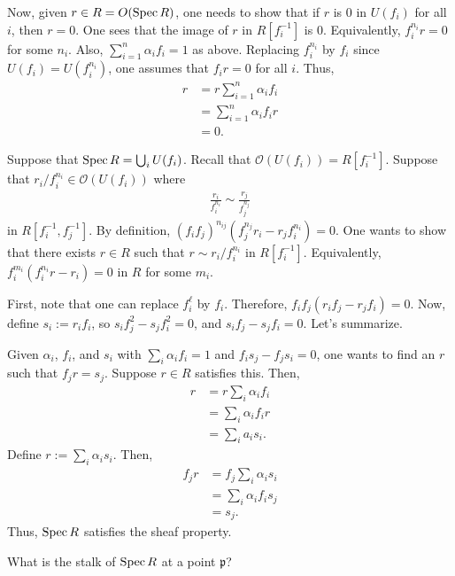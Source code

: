 \documentclass [11 pt, oneside] {article}
\begin{document}
Now, given $r\in R = \relax{O}(\operatorname{Spec} R)$, one needs to show that if $r$ is $0$ in $U({f_i})$ for all $i$, then $r=0$. One sees that the image of $r$ in $R[f_i^{-1}]$ is $0$. Equivalently, $f_i^{n_i} r = 0$ for some $n_i$. Also, $\sum_{i=1}^{n} \alpha_if_i=1$ as above. Replacing $f_i^{n_i}$ by $f_i$ since $U(f_i)=U({f_i^{n_i}})$, one assumes that $f_ir = 0$ for all $i$. Thus,
\begin{align*}
	r &= r \sum_{i=1}^{n} \alpha_if_i\\
	  &= \sum_{i=1}^{n} \alpha_i f_ir\\
	  &= 0.
\end{align*}

Suppose that $\operatorname{Spec} R = \bigcup_i U({f_i})$.
Recall that $\mathscr{O}(U({f_i}))=R[f_i^{-1}]$. Suppose that $r_i/f_i^{n_i}\in \mathscr{O}(U({f_i}))$ where
\begin{align*}
	\frac{r_i}{f_i^{n_i}} \sim \frac{r_j}{f_j^{n_j}}
\end{align*}
in $R[f_i^{-1},f_j^{-1}]$. By definition, $(f_if_j)^{n_{ij}}(f_j^{n_j}r_i - r_j f_i^{n_i})=0$. One wants to show that there exists $r\in R$ such that $r\sim r_i/f_i^{n_i}$ in $R[f_i^{-1}]$. Equivalently, $f_i^{m_i}(f_i^{n_i} r - r_i)=0$ in $R$ for some $m_i$.

First, note that one can replace $f_i^{\ell}$ by $f_i$. Therefore, $f_if_j(r_if_j - r_jf_i)=0$. Now, define $s_i := r_if_i$, so $s_i f_j^2 - s_jf_i^2=0$, and $s_if_j - s_j f_i =0$. Let's summarize.

Given $\alpha_i$, $f_i$, and $s_i$ with $\sum_{i}^{} \alpha_if_i=1$ and $f_is_j - f_js_i=0$, one wants to find an $r$ such that $f_jr = s_j$. Suppose $r\in R$ satisfies this. Then,
\begin{align*}
	r &= r \sum_{i}^{} \alpha_if_i\\
	  &= \sum_{i}^{} \alpha_i f_ir\\
	  &= \sum_{i}^{} a_is_i.
\end{align*}
Define $r:= \sum_{i}^{} \alpha_is_i$. Then,
\begin{align*}
	f_j r &= f_j \sum_{i}^{} \alpha_is_i\\
	      &= \sum_{i}^{} \alpha_i f_i s_j\\
	      &= s_j.
\end{align*}
Thus, $\operatorname{Spec} R$ satisfies the sheaf property.

\begin{problem}
	What is the stalk of $\operatorname{Spec} R$ at a point $\mathfrak{p}$?
\end{problem}
\end{document}
